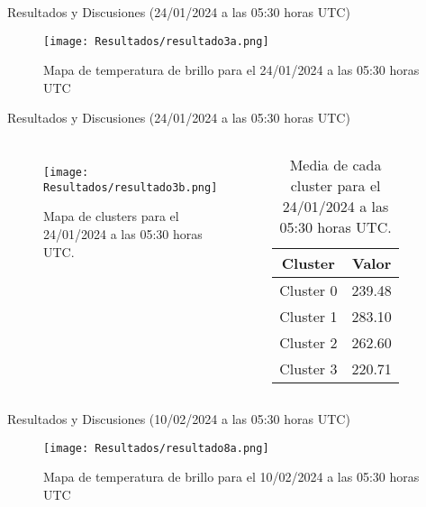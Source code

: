\documentclass[aspectratio=169,xcolor=dvipsnames]{beamer}
\begin{document}
\begin{frame}{Resultados y Discusiones (24/01/2024 a las 05:30 horas UTC)}
\begin{figure}
    \centering
    \texttt{[image: Resultados/resultado3a.png]}
    \caption{Mapa de temperatura de brillo para el 24/01/2024 a las 05:30 horas UTC}
    \label{fig10}
\end{figure}
\end{frame}
\begin{frame}{Resultados y Discusiones (24/01/2024 a las 05:30 horas UTC)}
    \begin{columns}

        \begin{figure}
            \centering
            \texttt{[image: Resultados/resultado3b.png]}
            {\footnotesize %
            \caption{Mapa de clusters para el 24/01/2024 a las 05:30 horas UTC.}
            \label{fig11}
            }
        \end{figure}

        \centering
        \begin{table}[h!]
            \centering
            {\footnotesize %
            \begin{tabular}{|c|c|}
                \hline
                \textbf{Cluster} & \textbf{Valor} \\
                \hline
                Cluster 0 & 239.48 \\
                Cluster 1 & 283.10 \\
                Cluster 2 & 262.60 \\
                Cluster 3 & 220.71 \\                
                \hline
            \end{tabular}
            \caption{Media de cada cluster para el 24/01/2024 a las 05:30 horas UTC.}
            }
        \end{table}

    \end{columns}
\end{frame}
\begin{frame}{Resultados y Discusiones (10/02/2024 a las 05:30 horas UTC)}
\begin{figure}
    \centering
    \texttt{[image: Resultados/resultado8a.png]}
    \caption{Mapa de temperatura de brillo para el 10/02/2024 a las 05:30 horas UTC}
    \label{fig12}
\end{figure}
\end{frame}
\end{document}
